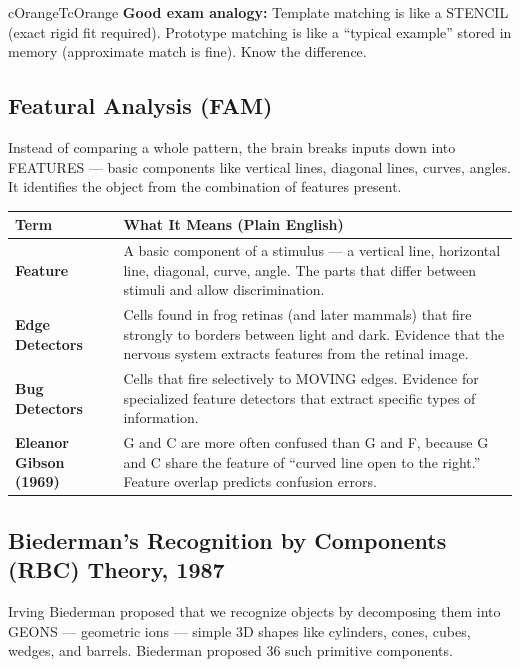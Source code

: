 \documentclass[11pt,a4paper]{article}
\newcommand{\bb}[1]{\textbf{#1}}
\begin{document}
\begin{hintbox}{cOrangeT}{cOrange}
\bb{Good exam analogy:} Template matching is like a STENCIL (exact rigid fit required). Prototype matching is like a ``typical example'' stored in memory (approximate match is fine). Know the difference.
\end{hintbox}

\subsection*{Featural Analysis (FAM)}

Instead of comparing a whole pattern, the brain breaks inputs down into FEATURES --- basic components like vertical lines, diagonal lines, curves, angles. It identifies the object from the combination of features present.

\begin{center}
\renewcommand{\arraystretch}{1.4}
\begin{tabular}{|L{3.2cm}|L{12cm}|}
\hline
{}\color{white}\bb{Term} & \color{white}\bb{What It Means (Plain English)} \\
\hline
\bb{Feature} & A basic component of a stimulus --- a vertical line, horizontal line, diagonal, curve, angle. The parts that differ between stimuli and allow discrimination. \\
\bb{Edge Detectors} & Cells found in frog retinas (and later mammals) that fire strongly to borders between light and dark. Evidence that the nervous system extracts features from the retinal image. \\
\bb{Bug Detectors} & Cells that fire selectively to MOVING edges. Evidence for specialized feature detectors that extract specific types of information. \\
\bb{Eleanor Gibson (1969)} & G and C are more often confused than G and F, because G and C share the feature of ``curved line open to the right.'' Feature overlap predicts confusion errors. \\
\hline
\end{tabular}
\end{center}

\subsection*{Biederman's Recognition by Components (RBC) Theory, 1987}

Irving Biederman proposed that we recognize objects by decomposing them into GEONS --- geometric ions --- simple 3D shapes like cylinders, cones, cubes, wedges, and barrels. Biederman proposed 36 such primitive components.
\end{document}

